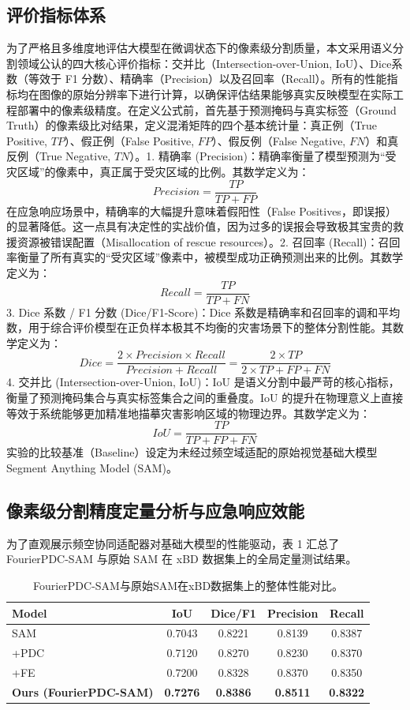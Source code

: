 \subsection{评价指标体系}
为了严格且多维度地评估大模型在微调状态下的像素级分割质量，本文采用语义分割领域公认的四大核心评价指标：交并比（Intersection-over-Union, IoU）、Dice系数（等效于 F1 分数）、精确率（Precision）以及召回率（Recall）。所有的性能指标均在图像的原始分辨率下进行计算，以确保评估结果能够真实反映模型在实际工程部署中的像素级精度。在定义公式前，首先基于预测掩码与真实标签（Ground Truth）的像素级比对结果，定义混淆矩阵的四个基本统计量：真正例（True Positive, $TP$）、假正例（False Positive, $FP$）、假反例（False Negative, $FN$）和真反例（True Negative, $TN$）。1. 精确率 (Precision)：精确率衡量了模型预测为“受灾区域”的像素中，真正属于受灾区域的比例。其数学定义为：$$Precision = \frac{TP}{TP + FP}$$在应急响应场景中，精确率的大幅提升意味着假阳性（False Positives，即误报）的显著降低。这一点具有决定性的实战价值，因为过多的误报会导致极其宝贵的救援资源被错误配置（Misallocation of rescue resources）。2. 召回率 (Recall)：召回率衡量了所有真实的“受灾区域”像素中，被模型成功正确预测出来的比例。其数学定义为：$$Recall = \frac{TP}{TP + FN}$$3. Dice 系数 / F1 分数 (Dice/F1-Score)：Dice 系数是精确率和召回率的调和平均数，用于综合评价模型在正负样本极其不均衡的灾害场景下的整体分割性能。其数学定义为：$$Dice = \frac{2 \times Precision \times Recall}{Precision + Recall} = \frac{2 \times TP}{2 \times TP + FP + FN}$$4. 交并比 (Intersection-over-Union, IoU)：IoU 是语义分割中最严苛的核心指标，衡量了预测掩码集合与真实标签集合之间的重叠度。IoU 的提升在物理意义上直接等效于系统能够更加精准地描摹灾害影响区域的物理边界。其数学定义为：$$IoU = \frac{TP}{TP + FP + FN}$$实验的比较基准（Baseline）设定为未经过频空域适配的原始视觉基础大模型 Segment Anything Model (SAM)。

\subsection{像素级分割精度定量分析与应急响应效能}
为了直观展示频空协同适配器对基础大模型的性能驱动，表 1 汇总了 FourierPDC-SAM 与原始 SAM 在 xBD 数据集上的全局定量测试结果。

\begin{table}[htbp]
\centering
\caption{FourierPDC-SAM与原始SAM在xBD数据集上的整体性能对比。}
\label{tab:performance_xbd}
\begin{tabular}{l c c c c}
\toprule
Model & IoU & Dice/F1 & Precision & Recall \\
\midrule
SAM                            & 0.7043 & 0.8221 & 0.8139 & 0.8387 \\
+PDC                           & 0.7120 & 0.8270 & 0.8230 & 0.8370 \\
+FE                            & 0.7200 & 0.8328 & 0.8370 & 0.8350 \\
\textbf{Ours (FourierPDC-SAM)} & \textbf{0.7276} & \textbf{0.8386} & \textbf{0.8511} & \textbf{0.8322} \\
\bottomrule
\end{tabular}
\end{table}

